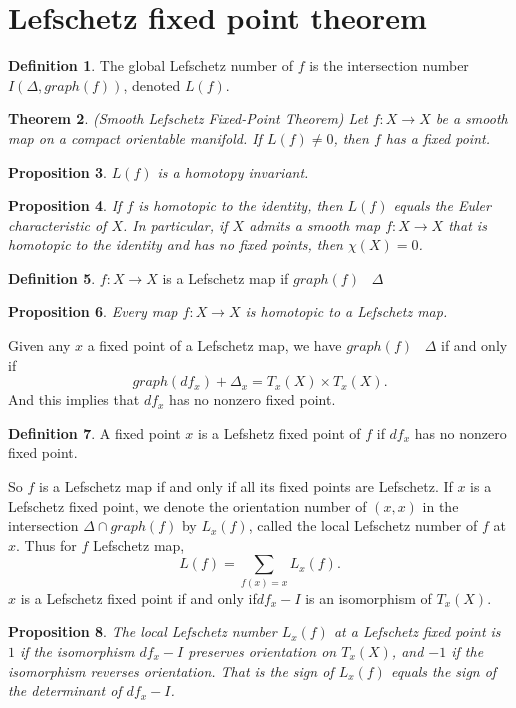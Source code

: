 \documentclass[psamsfonts]{amsart}
\newtheorem{theorem}{Theorem}[section]
\newtheorem{prop}[theorem]{Proposition}
\theoremstyle{definition}
\newtheorem{defn}[theorem]{Definition}
\theoremstyle{remark}
\numberwithin{equation}{section}
\begin{document}
	\section{Lefschetz fixed point theorem}
	\begin{defn}
			The global Lefschetz number of $f$ is the intersection number $I(\Delta, graph(f))$, denoted $L(f)$.
		\end{defn}
		\begin{theorem}(Smooth Lefschetz Fixed-Point Theorem)
			Let $f:X \to X$ be a smooth map on a compact orientable manifold. If $L(f) \neq 0$, then $f$ has a fixed point.			
		\end{theorem}
		\begin{prop}
			$L(f)$ is a homotopy invariant.
		\end{prop}
		\begin{prop}
			If $f$ is homotopic to the identity, then $L(f)$ equals the Euler characteristic of $X$. In particular, if $X$ admits a smooth map $f: X \to X$ that is homotopic to the identity and has no fixed points, then $\chi(X) = 0$.
		\end{prop}
		\begin{defn}
			$f: X \to X$ is a Lefschetz map if $graph(f)$ \;\;\makebox[0pt]{$\top$}\makebox[0pt]{$\cap$}\;\ $\Delta$
		\end{defn}
		\begin{prop}
			Every map $f: X \to X$ is homotopic to a Lefschetz map.
		\end{prop}
		Given any $x$ a fixed point of a Lefschetz map, we have $graph(f)$ \;\;\makebox[0pt]{$\top$}\makebox[0pt]{$\cap$}\;\ $\Delta$ if and only if
		\begin{equation}
			graph(df_x) + \Delta_x = T_x(X) \times T_x(X).
		\end{equation}
		And this implies that $df_x$ has no nonzero fixed point.
		\begin{defn}
			A fixed point $x$ is a Lefshetz fixed point of $f$ if $df_x$ has no nonzero fixed point.
		\end{defn}
		So $f$ is a Lefschetz map if and only if all its fixed points are Lefschetz. If $x$ is a Lefschetz fixed point, we denote the orientation number of $(x,x)$ in the intersection $\Delta \cap graph(f)$ by $L_x(f)$, called the local Lefschetz number of $f$ at $x$. Thus for $f$ Lefschetz map,
		\begin{equation}
			L(f) = \sum_{f(x)=x}L_x(f).
		\end{equation}
		$x$ is a Lefschetz fixed point if and only if$df_x - I$ is an isomorphism of $T_x(X)$.
		\begin{prop}
			The local Lefschetz number $L_x(f)$ at a Lefschetz fixed point is $1$ if the isomorphism $df_x-I$ preserves orientation on $T_x(X)$, and $-1$ if the isomorphism reverses orientation. That is the sign of $L_x(f)$ equals the sign of the determinant of $df_x - I$.
		\end{prop}
		
\end{document}
